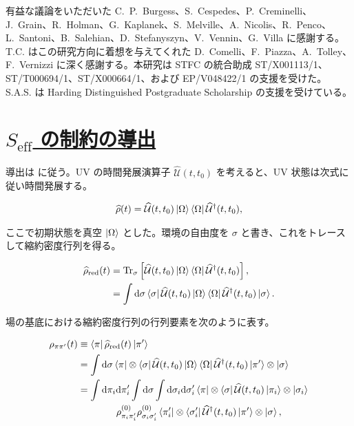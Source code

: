 \documentclass[a4paper,11pt]{ltjsarticle}
\newcommand{\sectionlink}[1]{\section[#1]{\hyperlink{toc}{#1}}}
\numberwithin{equation}{section}
\newcommand{\dd}{\mathrm{d}}
\begin{document}
有益な議論をいただいた C.~P.~Burgess、S.~Cespedes、P.~Creminelli、J.~Grain、R.~Holman、G.~Kaplanek、S.~Melville、A.~Nicolis、R.~Penco、L.~Santoni、B.~Salehian、D.~Stefanyszyn、V.~Vennin、G.~Villa に感謝する。T.C. はこの研究方向に着想を与えてくれた D.~Comelli、F.~Piazza、A.~Tolley、F.~Vernizzi に深く感謝する。本研究は STFC の統合助成 ST/X001113/1、ST/T000694/1、ST/X000664/1、および EP/V048422/1 の支援を受けた。S.A.S. は Harding Distinguished Postgraduate Scholarship の支援を受けている。


\clearpage
\renewcommand{\refname}{\hyperlink{toc}{参考文献}}


\clearpage
\appendix
\renewcommand{\theequation}{\Alph{section}.\arabic{equation}}


\sectionlink{\texorpdfstring{$S_{\mathrm{eff}}$}{Seff} の制約の導出}\label{app:deriv}

導出は \cite{Glorioso:2016gsa} に従う。UV の時間発展演算子 $\widehat{\mathcal{U}}(t,t_0)$ を考えると、UV 状態は次式に従い時間発展する。

\begin{align}
    \widehat{\rho}(t) = \widehat{\mathcal{U}}(t,t_0)  \ket{\Omega} \bra{\Omega}\widehat{\mathcal{U}}^\dag(t,t_0),
\end{align}

ここで初期状態を真空 $\ket{\Omega}$ とした。環境の自由度を $\sigma$ と書き、これをトレースして縮約密度行列を得る。

\begin{align}
    \widehat{\rho}_{\mathrm{red}} (t) &= \mathrm{Tr}_\sigma  \left[  \widehat{\mathcal{U}}(t,t_0)  \ket{\Omega} \bra{\Omega}\widehat{\mathcal{U}}^\dag(t,t_0) \right],\\
    &=\int \dd \sigma \bra{\sigma}  \widehat{\mathcal{U}}(t,t_0)  \ket{\Omega} \bra{\Omega} \widehat{\mathcal{U}}^\dag(t,t_0) \ket{\sigma}.
\end{align}

場の基底における縮約密度行列の行列要素を次のように表す。

\begin{align}
    \rho_{\pi \pi'} (t) &\equiv \bra{\pi} \widehat{\rho}_{\mathrm{red}} (t)\ket{\pi'} \\
    &= \int \dd \sigma  \bra{\pi} \otimes \bra{\sigma}  \widehat{\mathcal{U}}(t,t_0)  \ket{\Omega} \bra{\Omega} \widehat{\mathcal{U}}^\dag(t,t_0)  \ket{\pi'} \otimes \ket{\sigma}\\
    &=\int \dd \pi_i \dd \pi_i^\prime \int \dd \sigma \int \dd \sigma_i \dd \sigma_i^\prime \bra{\pi} \otimes \bra{\sigma}  \widehat{\mathcal{U}}(t,t_0) \ket{\pi_i} \otimes \ket{\sigma_i} \nonumber \\
    &\qquad \qquad  \rho^{(0)}_{\pi_i \pi_i^\prime} \rho^{(0)}_{\sigma_i \sigma_i^\prime}\bra{\pi_i^\prime} \otimes \bra{\sigma_i^\prime} \widehat{\mathcal{U}}^\dag(t,t_0)\ket{\pi'} \otimes \ket{\sigma},
\end{align}
\end{document}
